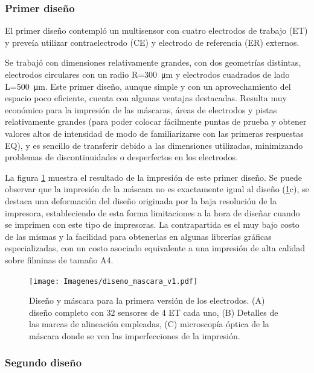 		\subsubsection{Primer diseño}

		     El primer diseño contempló un multisensor con cuatro electrodos de trabajo (ET) y preveía utilizar contraelectrodo (CE) y electrodo de referencia (ER) externos. 

     	     Se trabajó con dimensiones relativamente grandes, con dos geometrías distintas, electrodos circulares con un radio R=\SI{300}{\um} y electrodos cuadrados de lado L=\SI{500}{\um}. Este primer diseño, aunque simple y con un aprovechamiento del espacio poco eficiente, cuenta con algunas ventajas destacadas. Resulta muy económico para la impresión de las máscaras, áreas de electrodos y pistas relativamente grandes (para poder colocar fácilmente puntas de prueba y obtener valores altos de intensidad de modo de familiarizarse con las primeras respuestas EQ), y es sencillo de transferir debido a las dimensiones utilizadas, minimizando problemas de discontinuidades o desperfectos en los electrodos.
		     		
		     La figura \ref{fig:diseno_mascara_v1} muestra el resultado de la impresión de este primer diseño. Se puede observar que la impresión de la máscara no es exactamente igual al diseño (\ref{fig:diseno_mascara_v1}c), se destaca una deformación del diseño originada por la baja resolución de la impresora, estableciendo de esta forma limitaciones a la hora de diseñar cuando se imprimen con este tipo de impresoras. La contrapartida es el muy bajo costo de las mismas y la facilidad para obtenerlas en algunas librerías gráficas especializadas, con un costo asociado equivalente a una impresión de alta calidad sobre filminas de tamaño A4.
					
					\begin{figure}[h!]
		 	       	\texttt{[image: Imagenes/diseno\_mascara\_v1.pdf]}
 		       		\caption[Primer diseño y máscara de los sensores]{Diseño y máscara para la primera versión de los electrodos. (A) diseño completo con 32 sensores de 4 ET cada uno, (B) Detalles de las marcas de alineación empleadas, (C) microscopía óptica de la máscara donde se ven las imperfecciones de la impresión.}
 		         	\label{fig:diseno_mascara_v1}
 		     		\end{figure}

		\subsubsection{Segundo diseño}

